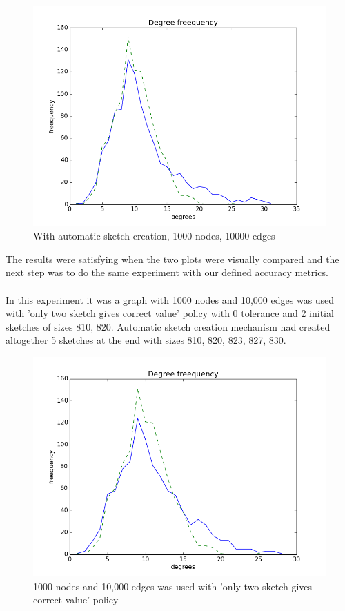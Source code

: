 \documentclass[12pt]{report}
\numberwithin{figure}{section}
\numberwithin{table}{section}
\begin{document}
\begin{figure}[H]
\centering
\includegraphics[scale=0.6]{images/ddas2}
\caption{With automatic sketch creation, 1000 nodes, 10000 edges}
\end{figure}

The results were satisfying when the two plots were visually compared and the next step was to do the same experiment with our defined accuracy metrics. 

\paragraph{}

In this experiment it was a graph with 1000 nodes and 10,000 edges was used with 'only two sketch gives correct value' policy with 0 tolerance and 2 initial sketches of sizes 810, 820. Automatic sketch creation mechanism had created altogether 5 sketches at the end with sizes 810, 820, 823, 827, 830.

\begin{figure}[H]
\centering
\includegraphics[scale=0.6]{images/AS-2init-2scale-0t-n1000-e10000-sketches-811-821-823-827-829plot}
\caption{1000 nodes and 10,000 edges was used with 'only two sketch gives correct value' policy}
\end{figure}
\end{document}
